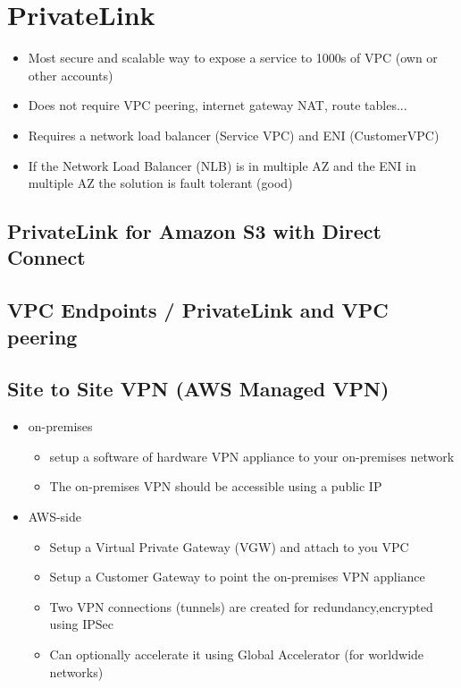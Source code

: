\section{PrivateLink}
\begin{itemize}
    \item Most secure and scalable way to expose a service to 1000s of VPC (own or other accounts)
    \item Does not require VPC peering, internet gateway NAT, route tables...
    \item Requires a network load balancer (Service VPC) and ENI (CustomerVPC)
    \item If the Network Load Balancer (NLB) is in multiple AZ and the ENI in multiple AZ the solution is fault tolerant (good)
\end{itemize}


\subsection{PrivateLink for Amazon S3 with Direct Connect}

\subsection{VPC Endpoints / PrivateLink and VPC peering}

\subsection{Site to Site VPN (AWS Managed VPN)}
\begin{itemize}
    \item on-premises
    \begin{itemize}
        \item setup a software of hardware VPN appliance to your on-premises network
        \item The on-premises VPN should be accessible using a public IP
    \end{itemize}
    \item AWS-side
    \begin{itemize}
        \item Setup a Virtual Private Gateway (VGW) and attach to you VPC
        \item Setup a Customer Gateway to point the on-premises VPN appliance
        \item Two VPN connections (tunnels) are created for redundancy,encrypted using IPSec
        \item Can optionally accelerate it using Global Accelerator (for worldwide networks)
    \end{itemize}
\end{itemize}

